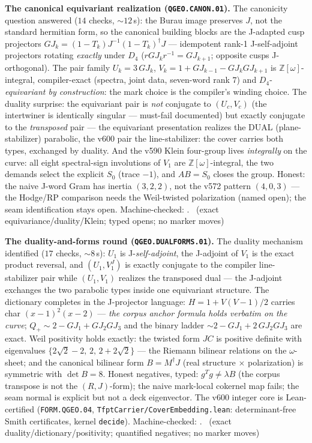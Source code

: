 \documentclass[11pt,a4paper]{article}
\theoremstyle{definition}
\begin{document}
\par\smallskip\noindent\textbf{The canonical equivariant realization
(\texttt{QGEO.CANON.01}).}
The canonicity question answered ($14$ checks, ${\sim}12$\,s): the
Burau image preserves $J$, not the standard hermitian form, so the
canonical building blocks are the J-adapted cusp projectors
$GJ_k=(1-T_k)J^{-1}(1-T_k)^\dagger J$ --- idempotent rank-1
J-self-adjoint projectors rotating \emph{exactly} under $D_4$
($rGJ_kr^{-1}=GJ_{k+1}$; opposite cusps J-orthogonal).  The pair
family $U_k=3\,GJ_k$, $V_k=1+GJ_{k-1}-GJ_kGJ_{k+1}$ is
$\mathbb{Z}[\omega]$-integral, compiler-exact (spectra, joint data,
seven-word rank $7$) and $D_4$-\emph{equivariant by construction}:
the mark choice is the compiler's winding choice.  The duality
surprise: the equivariant pair is \emph{not} conjugate to
$(U_c,V_c)$ (the intertwiner is identically singular --- must-fail
documented) but exactly conjugate to the \emph{transposed} pair ---
the equivariant presentation realizes the DUAL (plane-stabilizer)
parabolic, the v600 pair the line-stabilizer: the cover carries both
types, exchanged by duality.  And the v590 Klein four-group lives
\emph{integrally} on the curve: all eight spectral-sign involutions
of $V_1$ are $\mathbb{Z}[\omega]$-integral, the two demands select
the explicit $S_0$ (trace $-1$), and $AB=S_0$ closes the group.
Honest: the naive J-word Gram has inertia $(3,2,2)$, not the v572
pattern $(4,0,3)$ --- the Hodge/RP comparison needs the Weil-twisted
polarization (named open); the seam identification stays open.
Machine-checked: .
\mE\ (exact equivariance/duality/Klein; typed opens; no marker moves)
\par\smallskip

\par\smallskip\noindent\textbf{The duality-and-forms round
(\texttt{QGEO.DUALFORMS.01}).}
The duality mechanism identified ($17$ checks, ${\sim}8$\,s): $U_1$
is J-\emph{self-adjoint}, the J-adjoint of $V_1$ is the exact product
reversal, and $(U_1,V_1^J)$ is exactly conjugate to the compiler
line-stabilizer pair while $(U_1,V_1)$ realizes the transposed dual
--- the J-adjoint exchanges the two parabolic types inside one
equivariant structure.  The dictionary completes in the J-projector
language: $H=1+V(V-1)/2$ carries char $(x-1)^2(x-2)$ --- \emph{the
corpus anchor formula holds verbatim on the curve}; $Q_+\sim
2-GJ_1+GJ_2GJ_3$ and the binary ladder $\sim 2-GJ_1+2\,GJ_2GJ_3$ are
exact.  Weil positivity holds exactly: the twisted form $JC$ is
positive definite with eigenvalues $\{2\sqrt2-2,\,2,\,2+2\sqrt2\}$
--- the Riemann bilinear relations on the $\omega$-sheet; and the
canonical bilinear form $B=M^\dagger J$ (real structure $\times$
polarization) is symmetric with $\det B=8$.  Honest negatives, typed:
$g^Tg\ne\lambda B$ (the corpus transpose is not the $(R,J)$-form);
the naive mark-local cokernel map fails; the seam normal is explicit
but not a deck eigenvector.  The v600 integer core is Lean-certified
(\texttt{FORM.QGEO.04}, \texttt{TfptCarrier/CoverEmbedding.lean}:
determinant-free Smith certificates, kernel \texttt{decide}).
Machine-checked: .
\mE\ (exact duality/dictionary/positivity; quantified negatives; no
marker moves)
\par\smallskip
\end{document}
